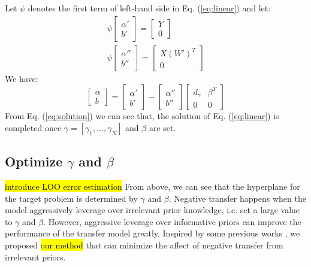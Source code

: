Let $\psi$ denotes the first term of left-hand side in Eq. (\ref{eq:linear}) and let:
\begin{equation}
\begin{array}{c}
 {\psi}\left[ {\begin{array}{*{20}{c}}
{\alpha '}\\
{b'}
\end{array}} \right] = \left[ {\begin{array}{*{20}{c}}
Y\\
0
\end{array}} \right]\\
{\psi}\left[ {\begin{array}{*{20}{c}}
{\alpha ''}\\
{b''}
\end{array}} \right] = \left[ {\begin{array}{*{20}{c}}
{X{{\left( {W'} \right)}^T}}\\
0
\end{array}} \right]
\end{array}
\end{equation}
We have:
\begin{equation}\label{eq:solution}
  \left[ {\begin{array}{*{20}{c}}
\alpha \\
b
\end{array}} \right] = \left[ {\begin{array}{*{20}{c}}
{\alpha '}\\
{b'}
\end{array}} \right] - \left[ {\begin{array}{*{20}{c}}
{\alpha ''}\\
{b''}
\end{array}} \right]\left[ {\begin{array}{*{20}{c}}
{d_\gamma }&{{\beta ^T}}\\
0&0
\end{array}} \right]
\end{equation}
From Eq. (\ref{eq:solution}) we can see that, the solution of Eq. (\ref{eq:linear}) is completed once $\gamma=\left[ \gamma_1,...,\gamma_N\right] $ and $\beta$ are set.

\subsection{Optimize $\gamma$ and $\beta$}
\hl{introduce LOO error estimation}
From above, we can see that the hyperplane for the target problem is determined by $\gamma$ and $\beta$. Negative transfer happens when the model aggressively leverage over irrelevant prior knowledge, i.e. set a  large value to $\gamma$ and $\beta$. However, aggressive leverage over informative priors can improve the performance of the transfer model greatly. Inspired by some previous works \cite{tommasi2014learning} \cite{kuzborskij2013n}, we proposed \hl{our method} that can minimize the affect of negative transfer from irrelevant priors.

